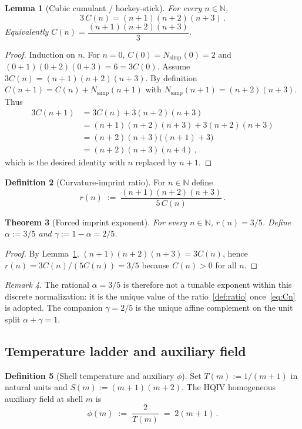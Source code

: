 \documentclass[11pt,a4paper]{article}
\theoremstyle{plain}
\newtheorem{theorem}{Theorem}
\newtheorem{lemma}[theorem]{Lemma}
\theoremstyle{definition}
\newtheorem{definition}[theorem]{Definition}
\theoremstyle{remark}
\newtheorem{remark}[theorem]{Remark}
\theoremstyle{plain}
\theoremstyle{definition}
\begin{document}
\begin{lemma}[Cubic cumulant / hockey-stick]\label{lem:hockey}
For every $n\in\mathbb{N}$,
\[
  3\,C(n) = (n+1)(n+2)(n+3)\,.
\]
Equivalently $C(n)=\dfrac{(n+1)(n+2)(n+3)}{3}$.
\end{lemma}

\begin{proof}
Induction on $n$.
For $n=0$, $C(0)=N_{\mathrm{simp}}(0)=2$ and $(0+1)(0+2)(0+3)=6=3C(0)$.
Assume $3C(n)=(n+1)(n+2)(n+3)$.
By definition $C(n+1)=C(n)+N_{\mathrm{simp}}(n+1)$ with $N_{\mathrm{simp}}(n+1)=(n+2)(n+3)$.
Thus
\begin{align*}
  3C(n+1) &= 3C(n)+3(n+2)(n+3) \\
  &= (n+1)(n+2)(n+3)+3(n+2)(n+3) \\
  &= (n+2)(n+3)\bigl((n+1)+3\bigr) \\
  &= (n+2)(n+3)(n+4)\,,
\end{align*}
which is the desired identity with $n$ replaced by $n+1$.
\end{proof}

\begin{definition}[Curvature-imprint ratio]\label{def:ratio}
For $n\in\mathbb{N}$ define
\[
  r(n) \;:=\; \frac{(n+1)(n+2)(n+3)}{5\,C(n)}\,.
\]
\end{definition}

\begin{theorem}[Forced imprint exponent]\label{thm:alpha}
For every $n\in\mathbb{N}$, $r(n)=3/5$.
Define $\alpha:=3/5$ and $\gamma:=1-\alpha=2/5$.
\end{theorem}

\begin{proof}
By Lemma~\ref{lem:hockey}, $(n+1)(n+2)(n+3)=3C(n)$, hence $r(n)=3C(n)/(5C(n))=3/5$ because $C(n)>0$ for all $n$.
\end{proof}

\begin{remark}
The rational $\alpha=3/5$ is therefore not a tunable exponent within this discrete normalization: it is the unique value of the ratio~\eqref{def:ratio} once~\eqref{eq:Cn} is adopted.
The companion $\gamma=2/5$ is the unique affine complement on the unit split $\alpha+\gamma=1$.
\end{remark}

\subsection{Temperature ladder and auxiliary field}

\begin{definition}[Shell temperature and auxiliary $\phi$]\label{def:phi}
Set $T(m):=1/(m+1)$ in natural units and $S(m):=(m+1)(m+2)$.
The HQIV homogeneous auxiliary field at shell $m$ is
\[
  \phi(m) \;:=\; \frac{2}{T(m)} \;=\; 2(m+1)\,.
\]
\end{definition}
\end{document}
